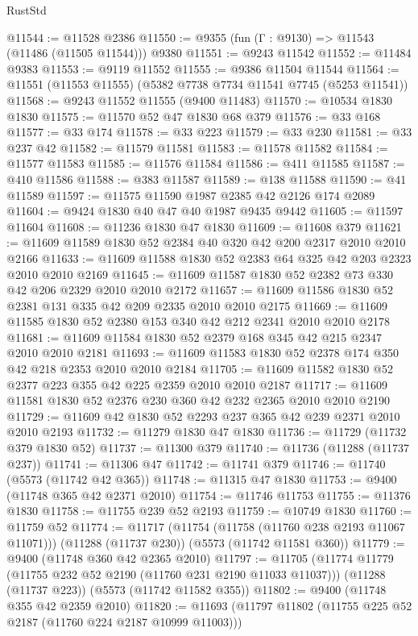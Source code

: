 \begin{lexlean}{RustStd}
\begin{coremodule}
@11544 := @11528 @2386
@11550 := @9355 (fun (Γ : @9130) => @11543 (@11486 (@11505 @11544))) @9380
@11551 := @9243 @11542
@11552 := @11484 @9383
@11553 := @9119 @11552
@11555 := @9386 @11504 @11544
@11564 := @11551 (@11553 @11555) (@5382 @7738 @7734 @11541 @7745 (@5253 @11541))
@11568 := @9243 @11552 @11555 (@9400 @11483)
@11570 := @10534 @1830 @1830
@11575 := @11570 @52 @47 @1830 @68 @379
@11576 := @33 @168
@11577 := @33 @174
@11578 := @33 @223
@11579 := @33 @230
@11581 := @33 @237 @42
@11582 := @11579 @11581
@11583 := @11578 @11582
@11584 := @11577 @11583
@11585 := @11576 @11584
@11586 := @411 @11585
@11587 := @410 @11586
@11588 := @383 @11587
@11589 := @138 @11588
@11590 := @41 @11589
@11597 := @11575 @11590 @1987 @2385 @42 @2126 @174 @2089
@11604 := @9424 @1830 @40 @47 @40 @1987 @9435 @9442
@11605 := @11597 @11604
@11608 := @11236 @1830 @47 @1830
@11609 := @11608 @379
@11621 := @11609 @11589 @1830 @52 @2384 @40 @320 @42 @200 @2317 @2010 @2010 @2166
@11633 := @11609 @11588 @1830 @52 @2383 @64 @325 @42 @203 @2323 @2010 @2010 @2169
@11645 := @11609 @11587 @1830 @52 @2382 @73 @330 @42 @206 @2329 @2010 @2010 @2172
@11657 := @11609 @11586 @1830 @52 @2381 @131 @335 @42 @209 @2335 @2010 @2010 @2175
@11669 := @11609 @11585 @1830 @52 @2380 @153 @340 @42 @212 @2341 @2010 @2010 @2178
@11681 := @11609 @11584 @1830 @52 @2379 @168 @345 @42 @215 @2347 @2010 @2010 @2181
@11693 := @11609 @11583 @1830 @52 @2378 @174 @350 @42 @218 @2353 @2010 @2010 @2184
@11705 := @11609 @11582 @1830 @52 @2377 @223 @355 @42 @225 @2359 @2010 @2010 @2187
@11717 := @11609 @11581 @1830 @52 @2376 @230 @360 @42 @232 @2365 @2010 @2010 @2190
@11729 := @11609 @42 @1830 @52 @2293 @237 @365 @42 @239 @2371 @2010 @2010 @2193
@11732 := @11279 @1830 @47 @1830
@11736 := @11729 (@11732 @379 @1830 @52)
@11737 := @11300 @379
@11740 := @11736 (@11288 (@11737 @237))
@11741 := @11306 @47
@11742 := @11741 @379
@11746 := @11740 (@5573 (@11742 @42 @365))
@11748 := @11315 @47 @1830
@11753 := @9400 (@11748 @365 @42 @2371 @2010)
@11754 := @11746 @11753
@11755 := @11376 @1830
@11758 := @11755 @239 @52 @2193
@11759 := @10749 @1830
@11760 := @11759 @52
@11774 := @11717
    (@11754 (@11758 (@11760 @238 @2193 @11067 @11071)))
    (@11288 (@11737 @230))
    (@5573 (@11742 @11581 @360))
@11779 := @9400 (@11748 @360 @42 @2365 @2010)
@11797 := @11705
    (@11774 @11779 (@11755 @232 @52 @2190 (@11760 @231 @2190 @11033 @11037)))
    (@11288 (@11737 @223))
    (@5573 (@11742 @11582 @355))
@11802 := @9400 (@11748 @355 @42 @2359 @2010)
@11820 := @11693
    (@11797 @11802 (@11755 @225 @52 @2187 (@11760 @224 @2187 @10999 @11003)))

\end{coremodule}
\end{lexlean}
